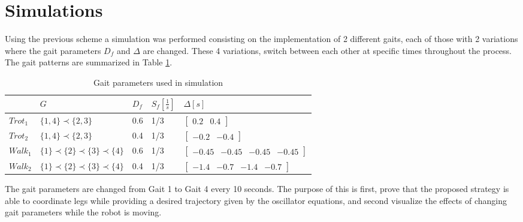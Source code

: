 \documentclass[main.tex]{subfiles}
\begin{document}
\section{Simulations}
Using the previous scheme a simulation was performed consisting on the implementation of 2 different gaits, each of those with 2 variations where the gait parameters $D_f$ and $\Delta$ are changed. These 4 variations, switch between each other at specific times throughout the process. The gait patterns are summarized in Table \ref{Table:GaitParameters}.
\begin{table}[b]
\centering
\caption{Gait parameters used in simulation}
\label{Table:GaitParameters}
\begin{tabular}{|l|l|l|l|l|}
\hline
       & $G$                                   & $D_f$ & $S_f[\frac{1}{s}]$ & $\Delta[s]$                                                 \\ \hline
$Trot_1$ & $\{1,4\}\prec\{2,3\}$                 & 0.6  & 1/3        & $\begin{bmatrix} 0.2 & 0.4\end{bmatrix}$               \\ \hline
$Trot_2$ & $\{1,4\}\prec\{2,3\}$                 & 0.4  & 1/3        & $\begin{bmatrix} -0.2 &-0.4\end{bmatrix}$                \\ \hline
$Walk_1$ & $\{1\}\prec\{2\}\prec\{3\}\prec\{4\}$ & 0.6  & 1/3       & $\begin{bmatrix} -0.45 & -0.45 & -0.45 & -0.45\end{bmatrix}$     \\ \hline
$Walk_2$ & $\{1\}\prec\{2\}\prec\{3\}\prec\{4\}$ & 0.4  & 1/3     & $\begin{bmatrix} -1.4 & -0.7 & -1.4 & -0.7\end{bmatrix}$ \\ \hline
\end{tabular}
\end{table}
The gait parameters are changed from Gait 1 to Gait 4 every 10 seconds. The purpose of this is first, prove that the proposed strategy is able to coordinate legs while providing a desired trajectory given by the oscillator equations, and second visualize the effects of changing gait parameters while the robot is moving. 
\end{document}

